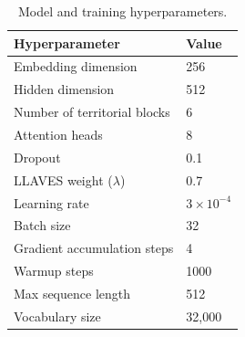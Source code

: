 \documentclass[11pt,a4paper]{article}
\begin{document}
\begin{table}[h]
\centering
\begin{tabular}{ll}
\toprule
\textbf{Hyperparameter} & \textbf{Value} \\
\midrule
Embedding dimension & 256 \\
Hidden dimension & 512 \\
Number of territorial blocks & 6 \\
Attention heads & 8 \\
Dropout & 0.1 \\
LLAVES weight ($\lambda$) & 0.7 \\
Learning rate & $3 \times 10^{-4}$ \\
Batch size & 32 \\
Gradient accumulation steps & 4 \\
Warmup steps & 1000 \\
Max sequence length & 512 \\
Vocabulary size & 32,000 \\
\bottomrule
\end{tabular}
\caption{Model and training hyperparameters.}
\label{tab:hyperparams}
\end{table}
\end{document}
